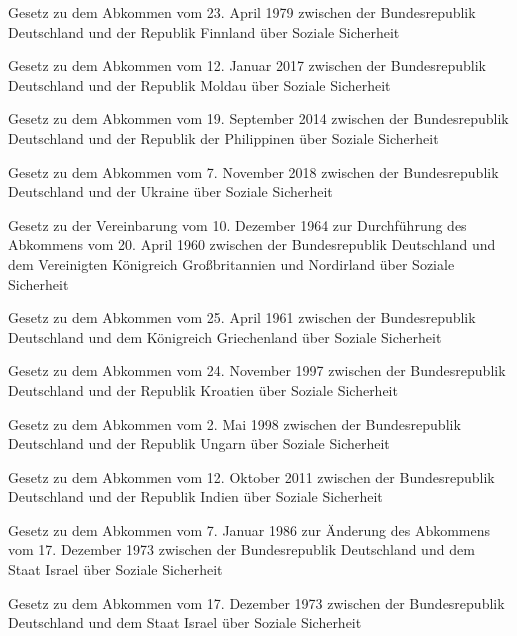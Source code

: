 \item[{SozSichAbkFING}] Gesetz zu dem Abkommen vom 23. April 1979 zwischen der Bundesrepublik Deutschland und der Republik Finnland über Soziale Sicherheit

\item[{SozSichAbkG-MDA}] Gesetz zu dem Abkommen vom 12. Januar 2017 zwischen der Bundesrepublik Deutschland und der Republik Moldau über Soziale Sicherheit

\item[{SozSichAbkG-PHL}] Gesetz zu dem Abkommen vom 19. September 2014 zwischen der Bundesrepublik Deutschland und der Republik der Philippinen über Soziale Sicherheit

\item[{SozSichAbkG-UKR}] Gesetz zu dem Abkommen vom 7. November 2018 zwischen der Bundesrepublik Deutschland und der Ukraine über Soziale Sicherheit

\item[{SozSichAbkGBRDVbgG}] Gesetz zu der Vereinbarung vom 10. Dezember 1964 zur Durchführung des Abkommens vom 20. April 1960 zwischen der Bundesrepublik Deutschland und dem Vereinigten Königreich Großbritannien und Nordirland über Soziale Sicherheit

\item[{SozSichAbkGRCG}] Gesetz zu dem Abkommen vom 25. April 1961 zwischen der Bundesrepublik Deutschland und dem Königreich Griechenland über Soziale Sicherheit

\item[{SozSichAbkHRVG}] Gesetz zu dem Abkommen vom 24. November 1997 zwischen der Bundesrepublik Deutschland und der Republik Kroatien über Soziale Sicherheit

\item[{SozSichAbkHUNG}] Gesetz zu dem Abkommen vom 2. Mai 1998 zwischen der Bundesrepublik Deutschland und der Republik Ungarn über Soziale Sicherheit

\item[{SozSichAbkINDG}] Gesetz zu dem Abkommen vom 12. Oktober 2011 zwischen der Bundesrepublik Deutschland und der Republik Indien über Soziale Sicherheit

\item[{SozSichAbkISRÄndAbkG}] Gesetz zu dem Abkommen vom 7. Januar 1986 zur Änderung des Abkommens vom 17. Dezember 1973 zwischen der Bundesrepublik Deutschland und dem Staat Israel über Soziale Sicherheit

\item[{SozSichAbkISRG}] Gesetz zu dem Abkommen vom 17. Dezember 1973 zwischen der Bundesrepublik Deutschland und dem Staat Israel über Soziale Sicherheit

